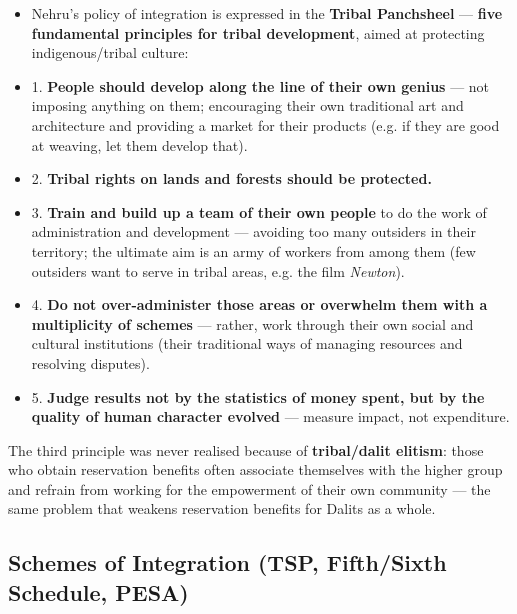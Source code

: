 \begin{GovtPolicy}
\begin{itemize}
\item Nehru's policy of integration is expressed in the \textbf{Tribal Panchsheel} --- \textbf{five fundamental principles for tribal development}, aimed at protecting indigenous/tribal culture:
\item 1. \textbf{People should develop along the line of their own genius} --- not imposing anything on them; encouraging their own traditional art and architecture and providing a market for their products (e.g. if they are good at weaving, let them develop that).
\item 2. \textbf{Tribal rights on lands and forests should be protected.}
\item 3. \textbf{Train and build up a team of their own people} to do the work of administration and development --- avoiding too many outsiders in their territory; the ultimate aim is an army of workers from among them (few outsiders want to serve in tribal areas, e.g. the film \emph{Newton}).
\item 4. \textbf{Do not over-administer those areas or overwhelm them with a multiplicity of schemes} --- rather, work through their own social and cultural institutions (their traditional ways of managing resources and resolving disputes).
\item 5. \textbf{Judge results not by the statistics of money spent, but by the quality of human character evolved} --- measure impact, not expenditure.
\end{itemize}
\end{GovtPolicy}

\begin{CriticalPoint}
The third principle was never realised because of \textbf{tribal/dalit elitism}: those who obtain reservation benefits often associate themselves with the higher group and refrain from working for the empowerment of their own community --- the same problem that weakens reservation benefits for Dalits as a whole.
\end{CriticalPoint}

\subsection{Schemes of Integration (TSP, Fifth/Sixth Schedule, PESA)}

